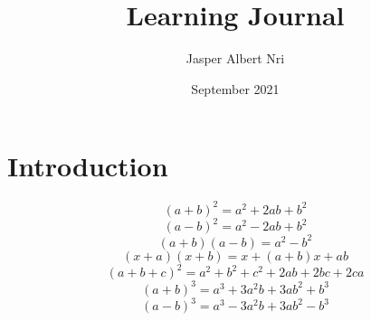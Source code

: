 \documentclass{article}
\title{Learning Journal}
\author{Jasper Albert Nri}
\date{September 2021}
\begin{document}
\maketitle

\section{Introduction}
$${(a+b)^2 = a^2 +2ab + b^2}$$
$${(a-b)^2 = a^2 - 2ab + b^2}$$
$${(a+b)(a-b) = a^2 -  b^2}$$
$${(x+a)(x+b) = x + (a+b)x + ab}$$
$${(a+b+c)^2 = a^2+b^2+c^2+2ab+2bc+2ca}$$
$${(a+b)^3 = a^3 + 3a^2b + 3ab^2 +b^3}$$
$${(a-b)^3 = a^3 - 3a^2b + 3ab^2 -b^3}$$
\end{document}
